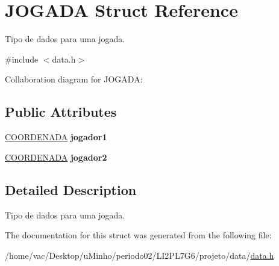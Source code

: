 \hypertarget{structJOGADA}{}\section{J\+O\+G\+A\+DA Struct Reference}
\label{structJOGADA}


Tipo de dados para uma jogada.  




{\ttfamily \#include $<$data.\+h$>$}



Collaboration diagram for J\+O\+G\+A\+DA\+:
\subsection*{Public Attributes}
\begin{DoxyCompactItemize}
\item 
\mbox{\label{structJOGADA_a93d9306cb0c49b66b7d9a615bffe0149}} 
\hyperlink{structCOORDENADA}{C\+O\+O\+R\+D\+E\+N\+A\+DA} {\bfseries jogador1}
\item 
\mbox{\label{structJOGADA_ab46b16dfbdc7f2af9430c8dcdac0914b}} 
\hyperlink{structCOORDENADA}{C\+O\+O\+R\+D\+E\+N\+A\+DA} {\bfseries jogador2}
\end{DoxyCompactItemize}


\subsection{Detailed Description}
Tipo de dados para uma jogada. 

The documentation for this struct was generated from the following file\+:\begin{DoxyCompactItemize}
\item 
/home/vac/\+Desktop/u\+Minho/periodo02/\+L\+I2\+P\+L7\+G6/projeto/data/\hyperlink{data_8h}{data.\+h}\end{DoxyCompactItemize}

